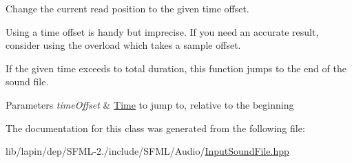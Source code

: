 Change the current read position to the given time offset. 

Using a time offset is handy but imprecise. If you need an accurate result, consider using the overload which takes a sample offset.

If the given time exceeds to total duration, this function jumps to the end of the sound file.


\begin{DoxyParams}{Parameters}
{\em time\-Offset} & \hyperlink{classsf_1_1_time}{Time} to jump to, relative to the beginning \\
\hline
\end{DoxyParams}


The documentation for this class was generated from the following file\-:\begin{DoxyCompactItemize}
\item 
lib/lapin/dep/\-S\-F\-M\-L-\/2./include/\-S\-F\-M\-L/\-Audio/\hyperlink{lapin_2dep_2_s_f_m_l-2_83_2include_2_s_f_m_l_2_audio_2_input_sound_file_8hpp}{Input\-Sound\-File.\-hpp}\end{DoxyCompactItemize}
